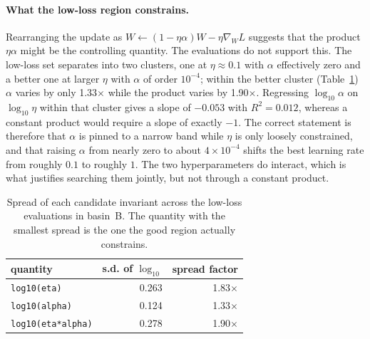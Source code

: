 \documentclass[11pt,a4paper]{article}
\newcommand{\code}[1]{\texttt{#1}}
\begin{document}
\paragraph{What the low-loss region constrains.} Rearranging the update as
$W\leftarrow(1-\eta\alpha)W-\eta\nabla_W L$ suggests that the product $\eta\alpha$
might be the controlling quantity. The evaluations do not support this. The low-loss
set separates into two clusters, one at $\eta\approx0.1$ with $\alpha$ effectively
zero and a better one at larger $\eta$ with $\alpha$ of order $10^{-4}$; within
the better cluster (Table~\ref{tab:spread}) $\alpha$ varies by only
1.33$\times$ while the product varies by
1.90$\times$. Regressing
$\log_{10}\alpha$ on $\log_{10}\eta$ within that cluster gives a slope of
$-0.053$ with
$R^2=0.012$, whereas a constant product would require a
slope of exactly $-1$. The correct statement is therefore that $\alpha$ is pinned to a
narrow band while $\eta$ is only loosely constrained, and that raising $\alpha$ from
nearly zero to about $4\times10^{-4}$ shifts the best learning rate from roughly
$0.1$ to roughly $1$. The two hyperparameters do interact, which is what justifies
searching them jointly, but not through a constant product.

\begin{table}[H]
\centering
\caption{Spread of each candidate invariant across the low-loss evaluations in basin~B. The quantity with the smallest spread is the one the good region actually constrains.}
\label{tab:spread}
\begin{tabular}{lrr}
\toprule
quantity & s.d. of $\log_{10}$ & spread factor \\
\midrule
\code{log10(eta)} & 0.263 & 1.83$\times$ \\
\code{log10(alpha)} & 0.124 & 1.33$\times$ \\
\code{log10(eta*alpha)} & 0.278 & 1.90$\times$ \\
\bottomrule
\end{tabular}
\end{table}
\end{document}
